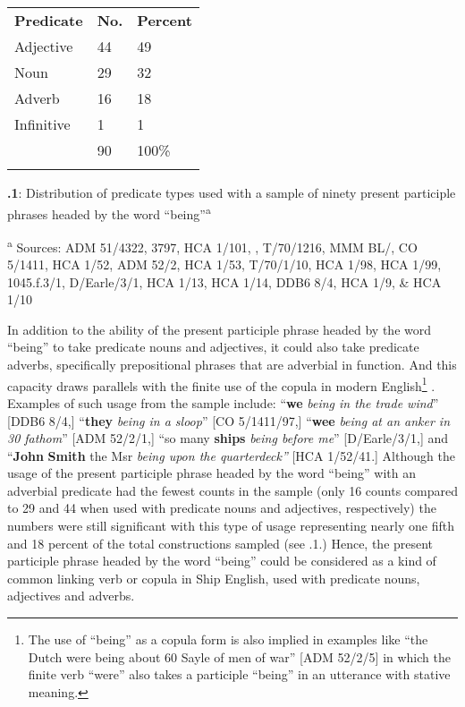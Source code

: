 \begin{flushright}
\tablefirsthead{}

\tabletail{}
\tablelasttail{}
\begin{tabularx}{\textwidth}{XXX}

\lsptoprule

\textbf{Predicate} & \textbf{No.} & \textbf{Percent}\\
Adjective & 44 & 49\\
Noun & 29 & 32\\
Adverb & 16 & 18\\
Infinitive & 1 & 1\\
& 90 & 100\%\\
\lspbottomrule
\end{tabularx}
\end{flushright}

\textbf{.1}: Distribution of predicate types used with a sample of ninety present participle phrases headed by the word “being”\textsuperscript{a} 

\textsuperscript{a} Sources: ADM 51/4322, 3797, HCA 1/101, \citealt{Brown2011}, T/70/1216, MMM BL/\citealt{Egerton2395}, CO 5/1411, HCA 1/52, ADM 52/2, HCA 1/53, T/70/1/10, HCA 1/98, HCA 1/99, 1045.f.3/1, D/Earle/3/1, HCA 1/13, HCA 1/14, DDB6 8/4, HCA 1/9, \& HCA 1/10

In addition to the ability of the present participle phrase headed by the word “being” to take predicate nouns and adjectives, it could also take predicate adverbs, specifically prepositional phrases that are adverbial in function. And this capacity draws parallels with the finite use of the copula in modern English\footnote{The use of “being” as a copula form is also implied in examples like “the Dutch were being about 60 Sayle of men of war” [ADM 52/2/5] in which the finite verb “were” also takes a participle “being” in an utterance with stative meaning.} . Examples of such usage from the sample include: “\textbf{we} \textit{being in the trade wind}” [DDB6 8/4,] “\textbf{they} \textit{being in a sloop}” [CO 5/1411/97,] “\textbf{wee} \textit{being at an anker in 30 fathom}” [ADM 52/2/1,] “so many \textbf{ships} \textit{being before me}” [D/Earle/3/1,] and “\textbf{John} \textbf{Smith} the Msr \textit{being upon the quarterdeck”} [HCA 1/52/41.] Although the usage of the present participle phrase headed by the word “being” with an adverbial predicate had the fewest counts in the sample (only 16 counts compared to 29 and 44 when used with predicate nouns and adjectives, respectively) the numbers were still significant with this type of usage representing nearly one fifth and 18 percent of the total constructions sampled (see .1.) Hence, the present participle phrase headed by the word “being” could be considered as a kind of common linking verb or copula in Ship English, used with predicate nouns, adjectives and adverbs. 

